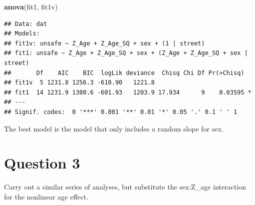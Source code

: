 \documentclass[]{article}
\newenvironment{Shaded}{\begin{snugshade}}{\end{snugshade}}
\newcommand{\KeywordTok}[1]{\textcolor[rgb]{0.13,0.29,0.53}{\textbf{#1}}}
\newcommand{\DataTypeTok}[1]{\textcolor[rgb]{0.13,0.29,0.53}{#1}}
\newcommand{\DecValTok}[1]{\textcolor[rgb]{0.00,0.00,0.81}{#1}}
\newcommand{\StringTok}[1]{\textcolor[rgb]{0.31,0.60,0.02}{#1}}
\newcommand{\OperatorTok}[1]{\textcolor[rgb]{0.81,0.36,0.00}{\textbf{#1}}}
\newcommand{\NormalTok}[1]{#1}
\begin{document}
\begin{Shaded}
\begin{Highlighting}[]
\KeywordTok{anova}\NormalTok{(fit1, fit1v)}
\end{Highlighting}
\end{Shaded}

\begin{verbatim}
## Data: dat
## Models:
## fit1v: unsafe ~ Z_Age + Z_Age_SQ + sex + (1 | street)
## fit1: unsafe ~ Z_Age + Z_Age_SQ + sex + (Z_Age + Z_Age_SQ + sex | street)
##       Df    AIC    BIC  logLik deviance  Chisq Chi Df Pr(>Chisq)  
## fit1v  5 1231.8 1256.3 -610.90   1221.8                           
## fit1  14 1231.9 1300.6 -601.93   1203.9 17.934      9    0.03595 *
## ---
## Signif. codes:  0 '***' 0.001 '**' 0.01 '*' 0.05 '.' 0.1 ' ' 1
\end{verbatim}

The best model is the model that only includes a random slope for sex.

\section{Question 3}\label{question-3}

Carry out a similar series of analyses, but substitute the sex:Z\_age
interaction for the nonlinear age effect.

\begin{Shaded}
\end{Shaded}
\end{document}
